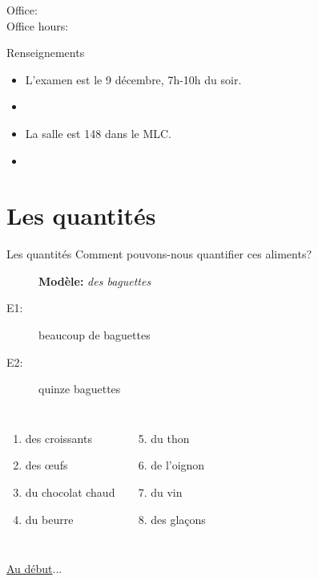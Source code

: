 \documentclass{beamer}
\subtitle[Révision: Dernier examen]{La révision pour le dernier examen}
\begin{document}
  \begin{frame}
    \titlepage
    \tiny{Office: \\
          Office hours: }
  \end{frame}

  \begin{frame}{Renseignements}
    \begin{itemize}
      \item L'examen est le 9 décembre, 7h-10h du soir.
      \item[] 
      \item La salle est 148 dans le MLC.
      \item[] 
    \end{itemize}
  \end{frame}

  \begin{frame}
    \hypertarget{début}{}
    \tableofcontents[hideallsubsections]
  \end{frame}

  \section{Les quantités}
    \begin{frame}{Les quantités}
      Comment pouvons-nous quantifier ces aliments?
      \begin{description}
        \item[] \textbf{Modèle:} \emph{des baguettes}
        \item[E1:] beaucoup de baguettes
        \item[E2:] quinze baguettes
      \end{description}
      \begin{columns}
          \begin{enumerate}
            \item des croissants
            \item des œufs
            \item du chocolat chaud
            \item du beurre
          \end{enumerate}
          \begin{enumerate}
            \setcounter{enumi}{4}
            \item du thon
            \item de l'oignon
            \item du vin
            \item des glaçons
          \end{enumerate}
      \end{columns}
      \vspace{0.5cm}
      \hyperlink{début}{Au début}...
    \end{frame}
\end{document}
